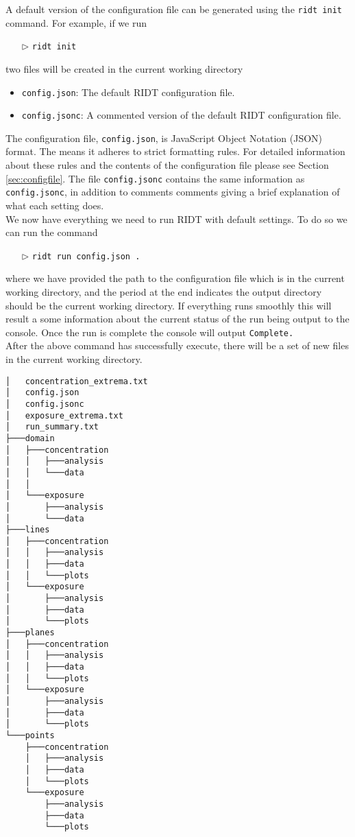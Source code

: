 \documentclass[]{article}
\def\code#1{\texttt{#1}}
\begin{document}
\noindent A default version of the configuration file can be generated using the
\code{ridt init} command. For example, if we run
\begin{itemize}
    \item[$\triangleright$] \code{ridt init}
\end{itemize}
two files will be created in the current working directory
\begin{itemize}
    \item \code{config.json}: The default RIDT configuration file.
    \item \code{config.jsonc}: A commented version of the default RIDT
    configuration file.
\end{itemize}

\noindent The configuration file, \code{config.json}, is JavaScript Object
Notation (JSON) format. The means it adheres to strict formatting rules. For
detailed information about these rules and the contents of the configuration
file please see Section \ref{sec:configfile}. The file \code{config.jsonc}
contains the same information as \code{config.jsonc}, in addition to comments
comments giving a brief explanation of what each setting does.\\

\noindent We now have everything we need to run RIDT with default settings. To
do so we can run the command 
\begin{itemize}
    \item[$\triangleright$] \code{ridt run config.json .}
\end{itemize}

\noindent where we have provided the path to the configuration file which is in
the current working directory, and the period at the end indicates the output
directory should be the current working directory. If everything runs smoothly
this will result a some information about the current status of the run being
output to the console. Once the run is complete the console will output
\code{Complete.}\\

\noindent After the above command has successfully execute, there will be a set
of new files in the current working directory.

\begin{verbatim}
│   concentration_extrema.txt
│   config.json
│   config.jsonc
│   exposure_extrema.txt
│   run_summary.txt
├───domain
│   ├───concentration
│   │   ├───analysis
│   │   └───data
│   │
│   └───exposure
│       ├───analysis
│       └───data
├───lines
│   ├───concentration
│   │   ├───analysis
│   │   ├───data
│   │   └───plots
│   └───exposure
│       ├───analysis
│       ├───data
│       └───plots
├───planes
│   ├───concentration
│   │   ├───analysis
│   │   ├───data
│   │   └───plots
│   └───exposure
│       ├───analysis
│       ├───data
│       └───plots
└───points
    ├───concentration
    │   ├───analysis
    │   ├───data
    │   └───plots
    └───exposure
        ├───analysis
        ├───data
        └───plots
\end{verbatim}
\end{document}
